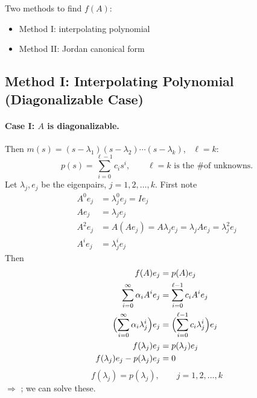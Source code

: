 Two methods to find $f(A)$:
\begin{itemize}[nosep]
\item Method I: interpolating polynomial
\item Method II: Jordan canonical form
\end{itemize}

\subsection{Method I: Interpolating Polynomial (Diagonalizable Case)}\label{ss:method1-diag}
\paragraph{Case I: $A$ is diagonalizable.} Then $m(s) = (s-\lambda_1)(s-\lambda_2)\cdots(s-\lambda_k)$, \ $\ell = k$:
\[
p(s) = \sum_{i=0}^{\ell-1}c_i s^i, \qquad \ell = k \text{ is the \# of unknowns.}
\]
Let $\lambda_j, e_j$ be the eigenpairs, $j = 1,2,\dots,k$. First note
\begin{align*}
A^0 e_j &= \lambda_j^0 e_j = Ie_j\\
A e_j &= \lambda_j e_j\\
A^2 e_j &= A(Ae_j) = A\lambda_j e_j = \lambda_j Ae_j = \lambda_j^2 e_j\\
A^i e_j &= \lambda_j^i e_j
\end{align*}
Then
\begin{align*}
f(A)e_j &= p(A)e_j\\
\sum_{i=0}^{\infty}\alpha_i A^i e_j &= \sum_{i=0}^{\ell-1}c_i A^i e_j\\
\Bigl(\sum_{i=0}^{\infty}\alpha_i\lambda_j^i\Bigr)e_j &= \Bigl(\sum_{i=0}^{\ell-1}c_i\lambda_j^i\Bigr)e_j\\
f(\lambda_j)e_j &= p(\lambda_j)e_j\\
f(\lambda_j)e_j - p(\lambda_j)e_j &= 0
\end{align*}
\[
\boxed{f(\lambda_j) = p(\lambda_j)}, \qquad j = 1,2,\dots,k
\]
$\Rightarrow$ ; we can solve these.

